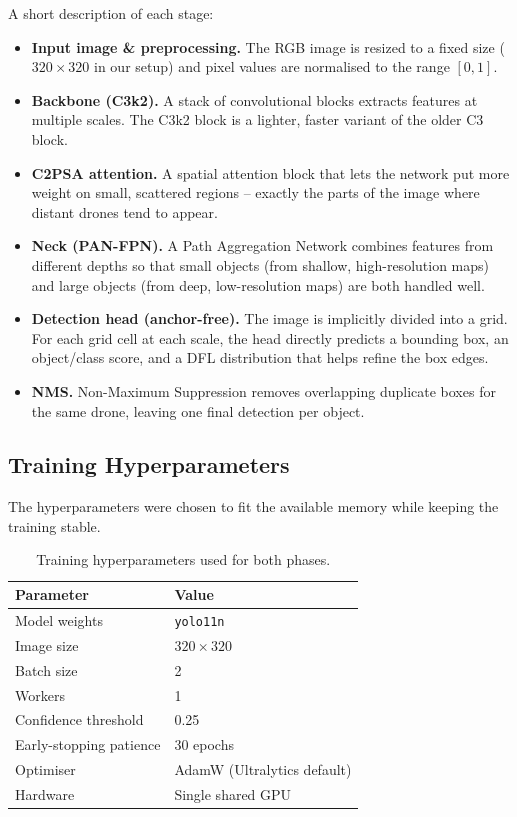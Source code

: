 \documentclass[12pt,a4paper]{report}
\begin{document}
A short description of each stage:
\begin{itemize}[noitemsep]
    \item \textbf{Input image \& preprocessing.} The RGB image is resized to a
          fixed size ($320\times320$ in our setup) and pixel values are
          normalised to the range $[0, 1]$.
    \item \textbf{Backbone (C3k2).} A stack of convolutional blocks extracts
          features at multiple scales. The C3k2 block is a lighter, faster
          variant of the older C3 block.
    \item \textbf{C2PSA attention.} A spatial attention block that lets the
          network put more weight on small, scattered regions -- exactly the
          parts of the image where distant drones tend to appear.
    \item \textbf{Neck (PAN-FPN).} A Path Aggregation Network combines features
          from different depths so that small objects (from shallow, high-resolution
          maps) and large objects (from deep, low-resolution maps) are both
          handled well.
    \item \textbf{Detection head (anchor-free).} The image is implicitly
          divided into a grid. For each grid cell at each scale, the head
          directly predicts a bounding box, an object/class score, and a DFL
          distribution that helps refine the box edges.
    \item \textbf{NMS.} Non-Maximum Suppression removes overlapping duplicate
          boxes for the same drone, leaving one final detection per object.
\end{itemize}

\subsection{Training Hyperparameters}
The hyperparameters were chosen to fit the available memory while keeping
the training stable.

\begin{table}[H]
\centering
\caption{Training hyperparameters used for both phases.}
\label{tab:hyperparams}
\begin{tabular}{ll}
\toprule
\textbf{Parameter}      & \textbf{Value} \\
\midrule
Model weights           & \texttt{yolo11n} \\
Image size              & $320 \times 320$ \\
Batch size              & 2 \\
Workers                 & 1 \\
Confidence threshold    & 0.25 \\
Early-stopping patience & 30 epochs \\
Optimiser               & AdamW (Ultralytics default) \\
Hardware                & Single shared GPU \\
\bottomrule
\end{tabular}
\end{table}
\end{document}
